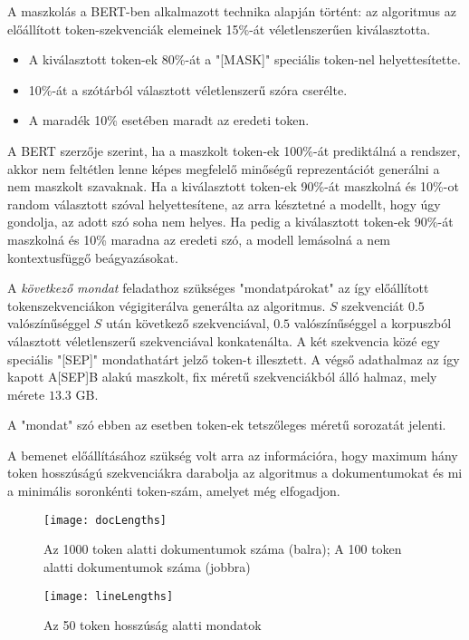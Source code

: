 A maszkolás a BERT-ben alkalmazott technika alapján történt: az algoritmus az előállított token-szekvenciák elemeinek 15\%-át véletlenszerűen kiválasztotta. 
\begin{itemize}
	\item A kiválasztott token-ek 80\%-át a "[MASK]" speciális token-nel helyettesítette. 
	\item 10\%-át a szótárból választott véletlenszerű szóra cserélte.
	\item A maradék 10\% esetében maradt az eredeti token.
\end{itemize}

A BERT szerzője szerint, ha a maszkolt token-ek 100\%-át prediktálná a rendszer, akkor nem feltétlen lenne képes megfelelő minőségű reprezentációt generálni a nem maszkolt szavaknak. Ha a kiválasztott token-ek 90\%-át maszkolná és 10\%-ot random választott szóval helyettesítene, az arra késztetné a modellt, hogy úgy gondolja, az adott szó soha nem helyes. Ha pedig a kiválasztott token-ek 90\%-át maszkolná és 10\% maradna az eredeti szó, a modell lemásolná a nem kontextusfüggő beágyazásokat. \cite{bertappendix}

A \textit{következő mondat} feladathoz szükséges "mondatpárokat" az így előállított tokenszekvenciákon végigiterálva generálta az algoritmus. $S$ szekvenciát $0.5$ valószínűséggel $S$ után következő szekvenciával, $0.5$ valószínűséggel a korpuszból választott véletlenszerű szekvenciával konkatenálta. A két szekvencia közé egy speciális "[SEP]" mondathatárt jelző token-t illesztett. A végső adathalmaz az így kapott A[SEP]B alakú maszkolt, fix méretű szekvenciákból álló halmaz, mely mérete $13.3$ GB.

\begin{note}
A "mondat" szó ebben az esetben token-ek tetszőleges méretű sorozatát jelenti.
\end{note}
 
A bemenet előállításához szükség volt arra az információra, hogy maximum hány token hosszúságú szekvenciákra darabolja az algoritmus a dokumentumokat és mi a minimális soronkénti token-szám, amelyet még elfogadjon. 

\begin{figure}[H]
	\centering
	\texttt{[image: docLengths]}
	\caption{Az 1000 token alatti dokumentumok száma (balra); A 100 token alatti dokumentumok száma (jobbra)}
\end{figure}

\begin{figure}[H]
	\centering
	\texttt{[image: lineLengths]}
	\caption{Az 50 token hosszúság alatti mondatok}
\end{figure}

